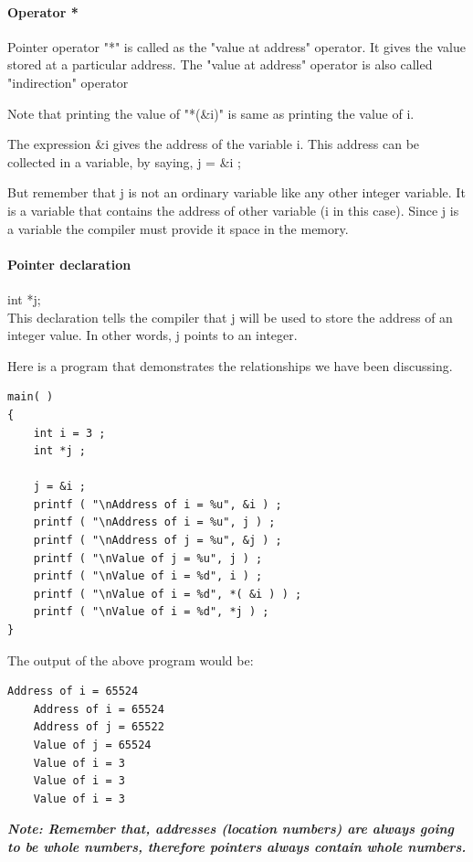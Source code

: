 \paragraph{Operator *} Pointer operator "*" is called as the "value at address" operator. It gives the value stored at a particular address. The "value at address" operator is also called "indirection" operator

Note that printing the value of "*(\&i)" is same as printing the value of i.

The expression \&i gives the address of the variable i. This address can be collected in a variable, by saying,
j = \&i ;

But remember that j is not an ordinary variable like any other integer variable. It is a variable that contains the address of other variable (i in this case). Since j is a variable the compiler must provide it space in the memory. 


\paragraph{Pointer declaration}
int *j;\\
This declaration tells the compiler that j will be used to store the address of an integer value. In other words, j points to an integer. 

Here is a program that demonstrates the relationships we have been discussing.

\begin{lstlisting}[style=CStyle]
main( )
{
    int i = 3 ;
    int *j ;

    j = &i ;
    printf ( "\nAddress of i = %u", &i ) ;
    printf ( "\nAddress of i = %u", j ) ;
    printf ( "\nAddress of j = %u", &j ) ;
    printf ( "\nValue of j = %u", j ) ;
    printf ( "\nValue of i = %d", i ) ;
    printf ( "\nValue of i = %d", *( &i ) ) ;
    printf ( "\nValue of i = %d", *j ) ;
}
\end{lstlisting}
The output of the above program would be:
\begin{lstlisting}[style=CStyle]
    Address of i = 65524
    Address of i = 65524
    Address of j = 65522
    Value of j = 65524
    Value of i = 3
    Value of i = 3
    Value of i = 3
\end{lstlisting}

\textbf{\textit{Note: Remember that, addresses (location numbers) are always going to be whole numbers, therefore pointers always contain whole numbers.}}